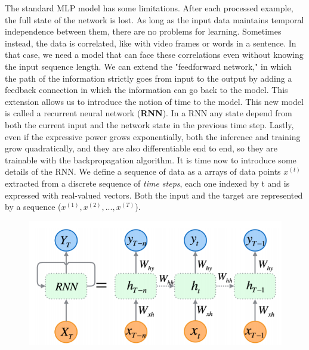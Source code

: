 The standard MLP model has some limitations. After each processed example, the full state of the network is lost. As long as the input data maintains temporal independence between them, there are no problems for learning.
Sometimes instead, the data is correlated, like with video frames or words in a sentence.
In that case, we need a model that can face these correlations even without knowing the input sequence length.
We can extend the "feedforward network," in which the path of the information strictly goes from input to the output by adding a feedback connection in which the information can go back to the model.
This extension allows us to introduce the notion of time to the model.
This new model is called a recurrent neural network (\textbf{RNN}).
In a RNN any state depend from both the current input and the network state in the previous time step.
Lastly, even if the expressive power grows exponentially, both the inference and training grow quadratically, and they are also differentiable end to end, so they are trainable with the backpropagation algorithm.
It is time now to introduce some details of the RNN.
We define a sequence of data as a arrays of data points $x^{(t)}$ extracted from a discrete sequence of \textit{time steps}, each one indexed by t and is expressed with real-valued vectors.
Both the input and the target are represented by a sequence ($x^{(1)},x^{(2)}, ..., x^{(T)}$).

\begin{figure}[h]
\centering
            \includegraphics[width=.5\textwidth]{pictures/rnn_schema}
            \end{figure}

